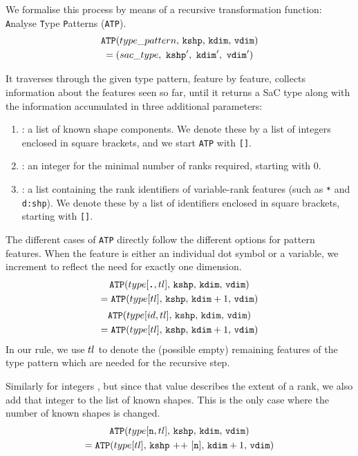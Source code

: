 \noindent
We formalise this process by means of a recursive transformation function: \texttt{A}nalyse \texttt{T}ype \texttt{P}atterns (\texttt{ATP}).
\begin{gather*}
    \texttt{ATP}(type\_pattern,\,\texttt{kshp},\,\texttt{kdim},\,\texttt{vdim}) \\
        = (sac\_type,\ \texttt{kshp}',\ \texttt{kdim}',\ \texttt{vdim}')
\end{gather*}

\noindent
It traverses through the given type pattern, feature by feature, collects information about the features seen so far, until it returns a SaC type along with the information accumulated in three additional parameters:
\begin{enumerate}
    \item \fshp{}: a list of known shape components.
    We denote these by a list of integers enclosed in square brackets, and we start \texttt{ATP} with \texttt{[]}.
    \item \fdim{}: an integer for the minimal number of ranks required, starting with 0.
    \item \vdim{}: a list containing the rank identifiers of variable-rank features (such as \texttt{*} and \texttt{d:shp}).
    We denote these by a list of identifiers enclosed in square brackets, starting with \texttt{[]}.
\end{enumerate}

\noindent
The different cases of \texttt{ATP} directly follow the different options for pattern features.
When the feature is either an individual dot symbol or a variable, we increment \fdim{} to reflect the need for exactly one dimension.
\begin{gather*}
    \texttt{ATP}(type[\texttt{\textbf{.}},tl],\,\texttt{kshp},\,\texttt{kdim},\,\texttt{vdim}) \\
        = \texttt{ATP}(type[tl],\,\texttt{kshp},\,\texttt{kdim}+1,\,\texttt{vdim})
    \\[2pt]
    \texttt{ATP}(type[id,tl],\,\texttt{kshp},\,\texttt{kdim},\,\texttt{vdim}) \\
        = \texttt{ATP}(type[tl],\,\texttt{kshp},\,\texttt{kdim}+1,\,\texttt{vdim})
\end{gather*}
In our rule, we use $tl$ to denote the (possible empty) remaining features of the type pattern which are needed for the recursive step.

\noindent
Similarly for integers \tpnum{}, but since that value describes the extent of a rank, we also add that integer to the list of known shapes.
This is the only case where the number of known shapes is changed.
\begin{gather*}
    \texttt{ATP}(type[\texttt{n},tl],\,\texttt{kshp},\,\texttt{kdim},\,\texttt{vdim}) \\
        = \texttt{ATP}(type[tl],\,\texttt{kshp} \text{ ++ } [\texttt{n}],\,\texttt{kdim}+1,\,\texttt{vdim})
\end{gather*}

